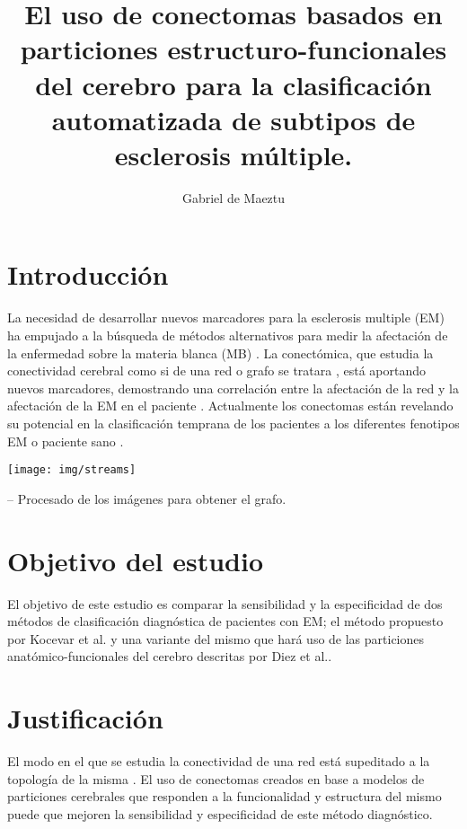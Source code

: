 \documentclass[
		portrait, %
		size=a1paper, %
		color=UICblack,
		margin=3cm,
		bannerheight=11cm
]{uicposter}
\title{El uso de conectomas basados en particiones estructuro-funcionales del cerebro para la clasificación automatizada de subtipos de esclerosis múltiple.}
\author[1 *]{Gabriel de Maeztu}
\affil[1]{Universitat Internacional de Catalunya}
\affil[*]{gabriel.maeztu@gmail.com}
\begin{document}
\maketitle

\begin{multicols}{2}

\section*{Introducción}

La necesidad de desarrollar nuevos marcadores para la esclerosis multiple (EM) ha empujado a la búsqueda de métodos alternativos para medir la afectación de la enfermedad sobre la materia blanca (MB)  \cite{Rio2017}. La conectómica, que estudia la conectividad cerebral como si de una red o grafo se tratara \cite{Bullmore2009}, está aportando nuevos marcadores, demostrando una correlación entre la afectación de la red y la afectación de la EM en el paciente \cite{Richiardi2012}. Actualmente los conectomas están revelando su potencial en la clasificación temprana de los pacientes a los diferentes fenotipos EM o paciente sano \cite{Kocevar2016}.

\begin{center}
	\texttt{[image: img/streams]}		
\end{center}
\begin{small}
	– Procesado de los imágenes para obtener el grafo.
\end{small}


\section*{Objetivo del estudio}
El objetivo de este estudio es comparar la sensibilidad y la especificidad de dos métodos de clasificación diagnóstica de pacientes con EM; el método propuesto por Kocevar et al.\cite{Kocevar2016} y una variante del mismo que hará uso de las particiones anatómico-funcionales del cerebro descritas por Diez et al.\cite{Diez2015}. 

\section*{Justificación}
El modo en el que se estudia la conectividad de una red está supeditado a la topología de la misma \cite{Zalesky2010}. El uso de conectomas creados en base a modelos de particiones cerebrales que responden a la funcionalidad y estructura del mismo puede que mejoren la sensibilidad y especificidad de este método diagnóstico.


\end{multicols}
\end{document}
